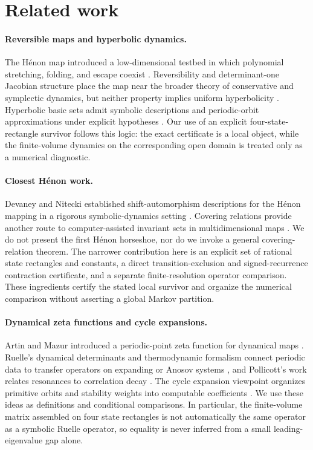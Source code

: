 \section{Related work}

\paragraph{Reversible maps and hyperbolic dynamics.}
The H\'enon map introduced a low-dimensional testbed in which polynomial stretching,
folding, and escape coexist \citep{Henon1976}.  Reversibility and determinant-one
Jacobian structure place the map near the broader theory of conservative and
symplectic dynamics, but neither property implies uniform hyperbolicity
\citep{KatokHasselblatt1995,Wiggins1990}.  Hyperbolic basic sets admit symbolic
descriptions and periodic-orbit approximations under explicit hypotheses
\citep{Bowen1975Equilibrium,AxiomAReference,LindMarcus1995}.  Our use of an
explicit four-state-rectangle survivor follows this logic: the exact
certificate is a local object, while the finite-volume dynamics on the
corresponding open domain is treated only as a numerical diagnostic.

\paragraph{Closest H\'enon work.}
Devaney and Nitecki established shift-automorphism descriptions for the H\'enon
mapping in a rigorous symbolic-dynamics setting \citep{DevaneyNitecki1979}.
Covering relations provide another route to computer-assisted invariant sets in
multidimensional maps \citep{ZgliczynskiGidea2004}.  We do not present the
first H\'enon horseshoe, nor do we invoke a general covering-relation theorem.
The narrower contribution here is an explicit set of rational state rectangles
and constants, a direct transition-exclusion and signed-recurrence contraction
certificate, and a separate finite-resolution operator comparison.  These
ingredients certify the stated local survivor and organize the numerical
comparison without asserting a global Markov partition.

\paragraph{Dynamical zeta functions and cycle expansions.}
Artin and Mazur introduced a periodic-point zeta function for dynamical maps
\citep{ArtinMazur1965}.  Ruelle's dynamical determinants and thermodynamic
formalism connect periodic data to transfer operators on expanding or Anosov
systems \citep{Ruelle1976Zeta,Ruelle1978Thermodynamic}, and Pollicott's work
relates resonances to correlation decay \citep{Pollicott1985Ruelle}.  The cycle
expansion viewpoint organizes primitive orbits and stability weights into
computable coefficients \citep{CvitanovicArtuso2009,Gutzwiller1990}.  We use
these ideas as definitions and conditional comparisons.  In particular, the
finite-volume matrix assembled on four state rectangles is not automatically
the same operator as a symbolic Ruelle operator, so equality is never inferred
from a small leading-eigenvalue gap alone.

